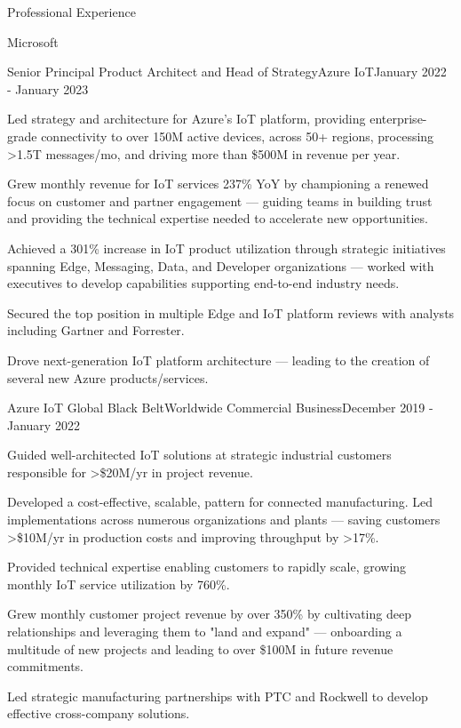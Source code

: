 \documentclass{resume} %
\begin{document}
\begin{rSection}{Professional Experience}
  \begin{rCompany}{Microsoft}{}{}
     \begin{rRole}{Senior Principal Product Architect and Head of Strategy}{Azure IoT}{January 2022 - January 2023}
        \item Led strategy and architecture for Azure's IoT platform, providing enterprise-grade connectivity to over 150M active devices, across 50+ regions, processing >1.5T messages/mo, and driving more than \$500M in revenue per year.
        \item Grew monthly revenue for IoT services 237\% YoY by championing a renewed focus on customer and partner engagement --- guiding teams in building trust and providing the technical expertise needed to accelerate new opportunities.
        \item Achieved a 301\% increase in IoT product utilization through strategic initiatives spanning Edge, Messaging, Data, and Developer organizations --- worked with executives to develop capabilities supporting end-to-end industry needs.
        \item Secured the top position in multiple Edge and IoT platform reviews with analysts including Gartner and Forrester.
        \item Drove next-generation IoT platform architecture --- leading to the creation of several new Azure products/services.
    
    \end{rRole}
    
    \begin{rRole}{Azure IoT Global Black Belt}{Worldwide Commercial Business}{December 2019 - January 2022}
        \item Guided well-architected IoT solutions at strategic industrial customers responsible for >\$20M/yr in project revenue. 
        \item Developed a cost-effective, scalable, pattern for connected manufacturing. Led implementations across numerous organizations and plants --- saving customers >\$10M/yr in production costs and improving throughput by >17\%. 
        \item Provided technical expertise enabling customers to rapidly scale, growing monthly IoT service utilization by 760\%.
        \item Grew monthly customer project revenue by over 350\% by cultivating deep relationships and leveraging them to "land and expand" --- onboarding a multitude of new projects and leading to over \$100M in future revenue commitments.\
        \item Led strategic manufacturing partnerships with PTC and Rockwell to develop effective cross-company solutions.
    \end{rRole}
    

\end{rCompany}
\end{rSection}
\end{document}
